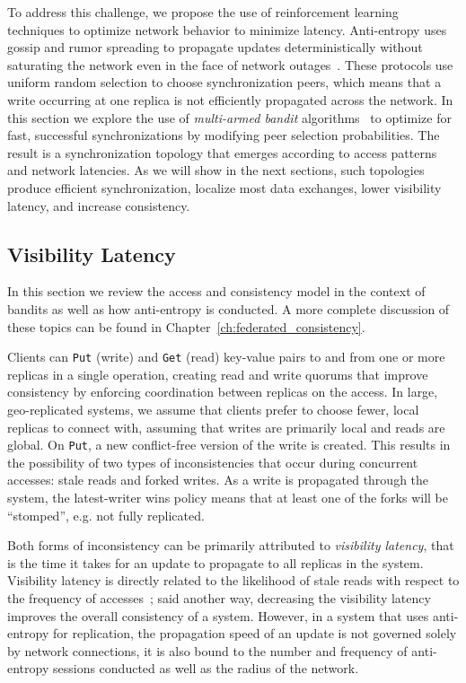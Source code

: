 To address this challenge, we propose the use of reinforcement learning techniques to optimize network behavior to minimize latency.
Anti-entropy uses gossip and rumor spreading to propagate updates
deterministically without saturating the
network even in the face of network
outages~\cite{gossip_protocols,rumor_spreading,rumor_spreading_dynamics}.
These protocols use uniform random selection to choose synchronization peers,
which means that a write occurring at one replica is not efficiently
propagated across the network.
In this section we explore the use of \textit{multi-armed bandit}
algorithms~\cite{epoch_greedy_mab,contextual_bandits} to optimize
for fast, successful synchronizations by modifying peer selection
probabilities.
The result is a synchronization topology that emerges according to access
patterns and network latencies.
As we will show in the next sections, such topologies produce efficient synchronization,
localize most data exchanges, lower visibility latency, and increase
consistency.

\subsection{Visibility Latency}

In this section we review the access and consistency model in the context of bandits as well as how anti-entropy is conducted.
A more complete discussion of these topics can be found in Chapter~\ref{ch:federated_consistency}.

Clients can \texttt{Put} (write) and \texttt{Get} (read) key-value pairs to
and from one or more replicas in a single operation, creating read and write quorums that improve consistency by enforcing coordination between replicas on the access.
In large, geo-replicated systems, we assume that clients prefer to choose fewer, local replicas to connect with, assuming that writes are primarily local and reads are global.
On \texttt{Put}, a new conflict-free version of the write is created.
This results in the possibility of two types of inconsistencies that occur during concurrent accesses: stale reads and forked writes.
As a write is propagated through the system, the latest-writer wins policy means that at least one of the forks will be ``stomped'', e.g. not fully replicated.

Both forms of inconsistency can be primarily attributed to \emph{visibility
latency}, that is the time it takes for an update to propagate to all
replicas in the system.
Visibility latency is directly related to the likelihood of stale reads with
respect to the frequency of accesses~\cite{quantifying_pbs}; said
another way, decreasing the visibility latency improves the overall
consistency of a system.
However, in a system that uses anti-entropy for replication, the propagation
speed of an update is not governed solely by network connections, it is also
bound to the number and frequency of anti-entropy sessions conducted as well
as the radius of the network.

